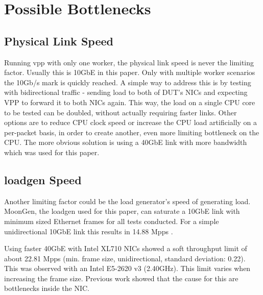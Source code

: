 \section{Possible Bottlenecks}

\subsection{Physical Link Speed}
\label{sec:linkspeed}


Running \Ac{vpp} with only one worker, the physical link speed is
never the limiting factor. Usually this is 10GbE in this paper. Only
with multiple worker scenarios the 10Gb/s mark is quickly reached. A
simple way to address this is by testing with bidirectional traffic -
sending load to both of DUT's NICs and expecting VPP to forward it to
both NICs again. This way, the load on a single CPU core to be tested
can be doubled, without actually requiring faster links. Other options
are to reduce CPU clock speed or increase the CPU load artificially on
a per-packet basis, in order to create another, even more limiting
bottleneck on the CPU. The more obvious solution is using a 40GbE link
with more bandwidth which was used for this paper.


\subsection{\Ac{loadgen} Speed}


Another limiting factor could be the load generator's speed of
generating load. MoonGen, the \Ac{loadgen} used for this paper, can
saturate a 10GbE link with minimum sized Ethernet frames for all tests
conducted. For a simple unidirectional 10GbE link this results in
14.88 Mpps \cite{emmerich2015assessing}.


\label{sec:40gbelimit}

Using faster 40GbE with Intel XL710 NICs showed a soft throughput
limit of about 22.81 Mpps (min. frame size, unidirectional, standard
deviation: 0.22). This was observed with an Intel E5-2620 v3
(2.40GHz). This limit varies when increasing the frame size. Previous
work showed that the cause for this are bottlenecks inside the NIC.
\cite{emmerich2015moongen}

